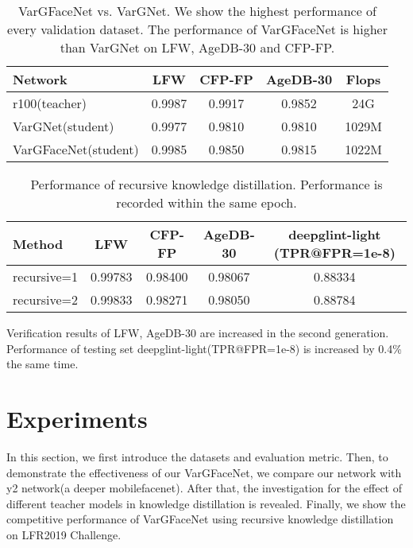 \documentclass[10pt,twocolumn,letterpaper]{article}
\begin{document}
\begin{table*}[h]
	\begin{center}
		\setlength{\tabcolsep}{5mm}
		\begin{tabular}{l|c|c|c|c}
			\hline
			\hline
			Network & LFW & CFP-FP & AgeDB-30 & Flops \\
			\hline
			r100(teacher) & 0.9987 & 0.9917 & 0.9852 & 24G \\
			\hline
			VarGNet(student) & 0.9977 & 0.9810 & 0.9810  & 1029M \\
			\hline
			VarGFaceNet(student) & 0.9985 & 0.9850 & 0.9815  & 1022M  \\
			\hline
			\hline
		\end{tabular}
	\end{center}
	\caption{VarGFaceNet vs. VarGNet. We show the highest performance of every validation dataset. The performance of VarGFaceNet is higher than VarGNet on LFW, AgeDB-30 and CFP-FP.}
	\label{VvV}
\end{table*}

\begin{table*}[h]
	\begin{center}
		\setlength{\tabcolsep}{7mm}
		\begin{tabular}{l|c|c|c|c}
			\hline
			\hline
			Method &  LFW & CFP-FP & AgeDB-30 & deepglint-light (TPR@FPR=1e-8) \\
			\hline
			recursive=1 & 0.99783 & 0.98400 & 0.98067 & 0.88334  \\
			\hline
			recursive=2 & 0.99833 & 0.98271 & 0.98050 & 0.88784 \\
			\hline
			\hline
		\end{tabular}
	\end{center}
	\caption{Performance of recursive knowledge distillation. Performance is recorded within the same epoch.}  Verification results of LFW, AgeDB-30 are increased in the second generation. Performance of testing set deepglint-light(TPR@FPR=1e-8) is increased by 0.4\% the same time.
	\label{rkd}
\end{table*}



\section{Experiments}
\label{Experiments}

In this section, we first introduce the datasets and evaluation metric. Then, to demonstrate the effectiveness of our VarGFaceNet, we compare our network with y2 network(a deeper mobilefacenet\cite{chen2018mobilefacenets,arcface}). After that, the investigation for the effect of different teacher models in knowledge distillation is revealed. Finally, we show the competitive performance of VarGFaceNet using recursive knowledge distillation on LFR2019 Challenge.
\end{document}
